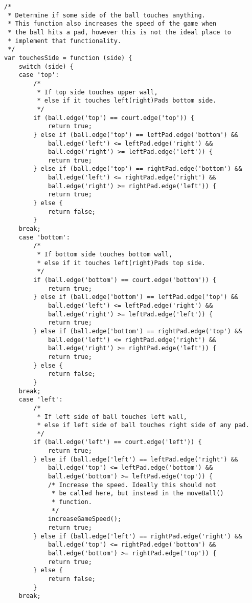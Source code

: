 \documentclass[a4paper,10pt]{article}
\begin{document}
\begin{verbatim}
/* 
 * Determine if some side of the ball touches anything. 
 * This function also increases the speed of the game when
 * the ball hits a pad, however this is not the ideal place to 
 * implement that functionality.
 */
var touchesSide = function (side) {
    switch (side) {
    case 'top':
        /* 
         * If top side touches upper wall, 
         * else if it touches left(right)Pads bottom side. 
         */
        if (ball.edge('top') == court.edge('top')) {
            return true;
        } else if (ball.edge('top') == leftPad.edge('bottom') &&
            ball.edge('left') <= leftPad.edge('right') &&
            ball.edge('right') >= leftPad.edge('left')) {
            return true;
        } else if (ball.edge('top') == rightPad.edge('bottom') &&
            ball.edge('left') <= rightPad.edge('right') &&
            ball.edge('right') >= rightPad.edge('left')) {
            return true;
        } else {
            return false;
        }
    break;
    case 'bottom':
        /* 
         * If bottom side touches bottom wall, 
         * else if it touches left(right)Pads top side. 
         */
        if (ball.edge('bottom') == court.edge('bottom')) {
            return true;
        } else if (ball.edge('bottom') == leftPad.edge('top') &&
            ball.edge('left') <= leftPad.edge('right') && 
            ball.edge('right') >= leftPad.edge('left')) {
            return true;
        } else if (ball.edge('bottom') == rightPad.edge('top') &&
            ball.edge('left') <= rightPad.edge('right') && 
            ball.edge('right') >= rightPad.edge('left')) {
            return true;
        } else {
            return false;
        }
    break;
    case 'left':
        /* 
         * If left side of ball touches left wall, 
         * else if left side of ball touches right side of any pad. 
         */
        if (ball.edge('left') == court.edge('left')) {
            return true;
        } else if (ball.edge('left') == leftPad.edge('right') &&
            ball.edge('top') <= leftPad.edge('bottom') &&
            ball.edge('bottom') >= leftPad.edge('top')) {
            /* Increase the speed. Ideally this should not
             * be called here, but instead in the moveBall()
             * function.
             */
            increaseGameSpeed();
            return true;
        } else if (ball.edge('left') == rightPad.edge('right') &&
            ball.edge('top') <= rightPad.edge('bottom') &&
            ball.edge('bottom') >= rightPad.edge('top')) {
            return true;
        } else {
            return false;
        }
    break;

\end{verbatim}
\end{document}
